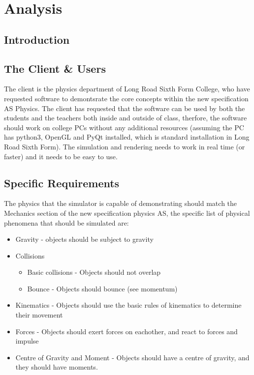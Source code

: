 \chapter{Analysis}

\section{Introduction}

\section{The Client & Users}
The client is the physics department of Long Road Sixth Form College, who have requested software to demontsrate the core concepts within the new specification AS Physics. The client has requested that the software can be used by both the students and the teachers both inside and outside of class, therfore, the software should work on college PCs without any additional resources (assuming the PC has python3, OpenGL and PyQt installed, which is standard installation in Long Road Sixth Form). The simulation and rendering needs to work in real time (or faster) and it needs to be easy to use.

\section{Specific Requirements}
The physics that the simulator is capable of demonstrating should match the Mechanics section of the new specification physics AS, the specific list of physical phenomena that should be simulated are: 
\begin{itemize}
	\item Gravity  - objects should be subject to gravity
	\item Collisions
	\begin{itemize}
		\item Basic collisions - Objects should not overlap
		\item Bounce - Objects should bounce (see momentum)
	\end{itemize}
	\item Kinematics - Objects should use the basic rules of kinematics to determine their movement
	\item Forces - Objects should exert forces on eachother, and react to forces and impulse
	\item Centre of Gravity and Moment - Objects should have a centre of gravity, and they should have moments.
\end{itemize}

